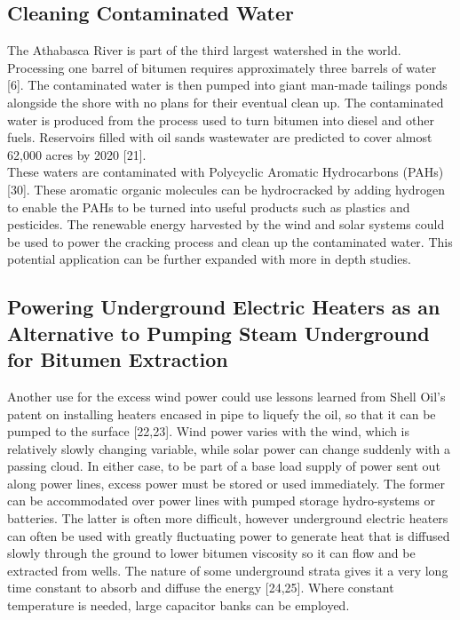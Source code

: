 \documentclass[11pt]{article}
\begin{document}
\subsection{Cleaning Contaminated Water}
The Athabasca River is part of the third largest watershed in the world. Processing one barrel of bitumen requires approximately three barrels of water [6]. The contaminated water is then pumped into giant man-made tailings ponds alongside the shore with no plans for their eventual clean up.  The contaminated water is produced from the process used to turn bitumen into diesel and other fuels. Reservoirs filled with oil sands wastewater are predicted to cover almost 62,000 acres by 2020 [21]. \\

These waters are contaminated with Polycyclic Aromatic Hydrocarbons (PAHs) [30]. These aromatic organic molecules can be hydrocracked by adding hydrogen to enable the PAHs to be turned into useful products such as plastics and pesticides. The renewable energy harvested by the wind and solar systems could be used to power the cracking process and clean up the contaminated water. This potential application can be further expanded with more in depth studies. 

\subsection{Powering Underground Electric Heaters as an Alternative to Pumping Steam Underground for Bitumen Extraction}

Another use for the excess wind power could use lessons learned from Shell Oil’s patent on installing heaters encased in pipe to liquefy the oil, so that it can be pumped to the surface [22,23]. Wind power varies with the wind, which is relatively slowly changing variable, while solar power can change suddenly with a passing cloud. In either case, to be part of a base load supply of power sent out along power lines, excess power must be stored or used immediately. The former can be accommodated over power lines with pumped storage hydro-systems or batteries. The latter is often more difficult, however underground electric heaters can often be used with greatly fluctuating power to generate heat that is diffused slowly through the ground to lower bitumen viscosity so it can flow and be extracted from wells. The nature of some underground strata gives it a very long time constant to absorb and diffuse the energy [24,25]. Where constant temperature is needed, large capacitor banks can be employed.
\end{document}
